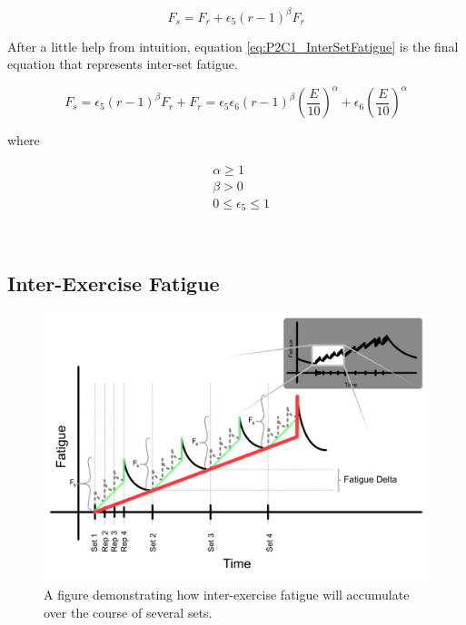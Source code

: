 \begin{equation*}
	F_s =
	F_{r} + \epsilon_5 (r-1)^\beta F_r
\end{equation*}

After a little help from intuition, equation \ref{eq:P2C1_InterSetFatigue} is the final equation that represents inter-set fatigue. 

\begin{minipage}{\textwidth}
	\begin{equation}
		\label{eq:P2C1_InterSetFatigue}
		F_s = \epsilon_5 (r-1) ^ \beta F_r + F_r 
		= \epsilon_5 \epsilon_6 (r-1)^\beta \left( 
			\frac{E}{10} 
		\right)^\alpha
		+ \epsilon_6 \left( \frac{E}{10} \right)^\alpha
	\end{equation}
	\centerline{where}
	\begin{equation*}
		\begin{split}
		    & \alpha \ge 1 \\
		    & \beta > 0 \\
			& 0 \le \epsilon_5 \le 1
		\end{split}
	\end{equation*}
\end{minipage}\\

\subsection{Inter-Exercise Fatigue}
\label{sec:P2C1_InterExerciseFatigue}

\begin{figure}[htb]
    \centering
    \includegraphics[scale=0.55]{images/p2/ch1/InterExerciseFatigue.png}
    \caption{A figure demonstrating how inter-exercise fatigue will accumulate over the course of several sets.}
    \label{fig:P2C1_InterExerciseFatigue}
\end{figure}


